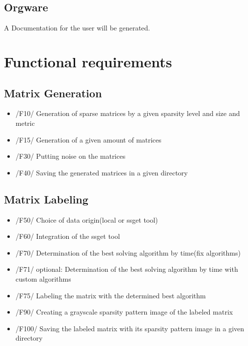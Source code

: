 \documentclass[parskip=full]{scrartcl}
\begin{document}
\subsection{Orgware}
A Documentation for the user will be generated.


\section{Functional requirements}
\subsection{Matrix Generation}
	\begin{itemize}
	\item /F10/ Generation of sparse matrices by a given sparsity level and size and metric
	\item /F15/ Generation of a given amount of matrices
	\item /F30/ Putting noise on the matrices
 	\item /F40/ Saving the generated matrices in a given directory
          \end{itemize}
\subsection{Matrix Labeling}
	\begin{itemize}
	\item /F50/ Choice of data origin(local or ssget tool) 
	\item /F60/ Integration of the ssget tool
	\item /F70/ Determination of the best solving algorithm by time(fix algorithms)
	\item /F71/ optional: Determination of the best solving algorithm by time with custom algorithms
	\item /F75/ Labeling the matrix with the determined best algorithm
	\item /F90/ Creating a grayscale sparsity pattern image of the labeled matrix
	\item /F100/ Saving the labeled matrix with its sparsity pattern image in a given directory 
	\end{itemize}
	
	
\end{document}
